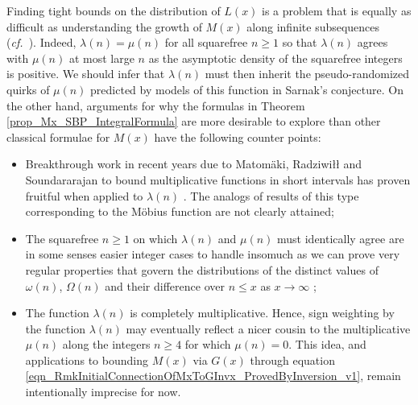 \documentclass[11pt,reqno,a4letter]{article}
\newcommand{\hlocalref}[1]{\hyperref[#1]{\ref{#1}}}
\numberwithin{equation}{section}
\numberwithin{figure}{section}
\numberwithin{table}{section}
\let\citep\cite
\newcommand{\cf}{\textit{cf.\ }}
\theoremstyle{plain}
\numberwithin{theorem}{section}
\theoremstyle{definition}
\begin{document}
Finding tight bounds on the distribution of 
$L(x)$ is a problem that is equally as difficult 
as understanding the growth of $M(x)$
along infinite subsequences (\cf \cite{MR2877066,MR3779960,TAO-LOGAVGD-CHOWLA}). 
Indeed, $\lambda(n) = \mu(n)$ for all squarefree $n \geq 1$ so that 
$\lambda(n)$ agrees with $\mu(n)$ at most large $n$ as the asymptotic density of the 
squarefree integers is positive. 
We should infer that $\lambda(n)$ must then inherit the pseudo-randomized quirks 
of $\mu(n)$ predicted by models of this function in Sarnak's conjecture. 
On the other hand, arguments for why the formulas in 
Theorem \hlocalref{prop_Mx_SBP_IntegralFormula} are more desirable to explore than 
other classical formulae for $M(x)$ have the following counter points:
\begin{itemize}[noitemsep,topsep=0pt,leftmargin=0.23in]
\item Breakthrough work in recent years due to 
	Matom\"aki, Radziwi{\l\l} and Soundararajan to 
	bound multiplicative functions 
	in short intervals has 
	proven fruitful when applied to $\lambda(n)$ 
	\cite{SOUND-LLAMBDA-SHORT-INTS,MATRADZE-MULTFUNCS-SHORT-INTS}. 
	The analogs of results of this type corresponding 
	to the M\"obius function are not clearly attained; 
\item The squarefree $n \geq 1$ on which $\lambda(n)$ and $\mu(n)$ must identically agree 
	are in some senses easier integer cases to handle 
	insomuch as we can prove very regular properties 
	that govern the distributions of the distinct values of 
	$\omega(n)$, $\Omega(n)$ and their difference over $n \leq x$ as $x \rightarrow \infty$ 
	\citep[\cf \S 2.4; \S 7.4]{MV}; 
\item The function $\lambda(n)$ is completely 
	multiplicative. Hence, sign weighting by the function $\lambda(n)$ may eventually reflect 
	a nicer cousin to the multiplicative $\mu(n)$ along the 
	integers $n \geq 4$ for which $\mu(n) = 0$. 
	This idea, and applications to bounding $M(x)$ via $G(x)$ through 
	equation \eqref{eqn_RmkInitialConnectionOfMxToGInvx_ProvedByInversion_v1}, 
	remain intentionally imprecise for now.
\end{itemize}

\renewcommand{\refname}{References} 

\end{document}
